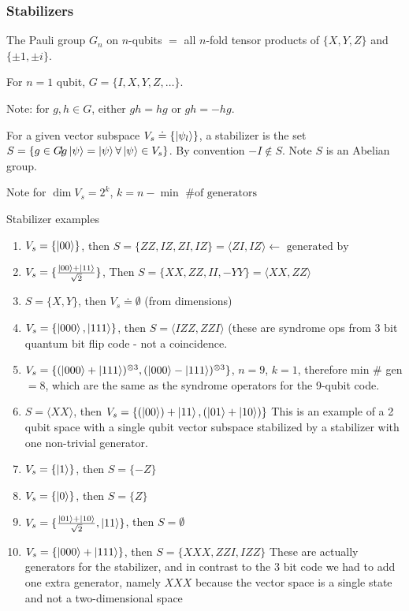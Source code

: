 \subsubsection{Stabilizers}
\begin{definition}
    The Pauli group $G_n$ on $n$-qubits $=$ all $n$-fold tensor products of $\{X,Y,Z\}$ and $\{\pm 1, \pm i\}$. 
\end{definition}
\begin{example}
    For $n=1$ qubit, $G = \{I, X,Y, Z, \ldots \}$. 
\end{example}
Note: for $g,h \in G$, either $gh=hg$ or $gh=-hg$. 
\begin{definition}
    For a given vector subspace $V_s \doteq \{\ket{\psi_l}\}$, a stabilizer is the set $S = \{g \in G \! | \! g \ket{\psi} = \ket{\psi} \forall \ket{\psi} \in V_s\}$. By convention $-I \notin S$. Note $S$ is an Abelian group. 
\end{definition}
Note for $\dim V_s = 2^k$, $k = n - \min \text{ \# of generators}$
\begin{example} Stabilizer examples 
    \begin{enumerate}
        \item $V_s = \{\ket{00}\}$, then $S = \{ZZ,IZ, ZI,IZ\} = \langle ZI, IZ \rangle \leftarrow \text{ generated by}$ 
        \item $V_s = \{\frac{\ket{00} + \ket{11}}{\sqrt{2}}\}$, Then $S = \{XX,ZZ,II,-YY\} = \langle XX,ZZ\rangle$
        \item $S = \{X,Y\}$, then $V_s \doteq \emptyset$ (from dimensions)
        \item $V_s = \{\ket{000}, \ket{111}\}$, then $S = \langle IZZ,ZZI \rangle$ (these are syndrome ops from 3 bit quantum bit flip code - not a coincidence. 
        \item $V_s = \{(\ket{000} + \ket{111})^{\otimes 3}, (\ket{000} - \ket{111})^{\otimes 3}\}$, $n=9$, $k=1$, therefore min \# gen $= 8$, which are the same as the syndrome operators for the 9-qubit code. 
        \item $S= \langle XX \rangle$, then $V_s = \{(\ket{00}) + \ket{11}, (\ket{01} + \ket{10})\}$ This is an example of a 2 qubit space with a single qubit vector subspace stabilized by a stabilizer with one non-trivial generator. 
        \item $V_s = \{\ket{1}\}$, then $S = \{-Z\}$
        \item $V_s = \{\ket{0}\}$, then $S = \{Z\}$
        \item $V_s = \{\frac{\ket{01} + \ket{10}}{\sqrt{2}}, \ket{11}\}$, then $S = \emptyset$
        \item $V_s = \{\ket{000} + \ket{111}\}$, then $S = \{XXX,ZZI,IZZ\}$ These are actually generators for the stabilizer, and in contrast to the 3 bit code we had to add one extra generator, namely $XXX$ because the vector space is a single state and not a two-dimensional space
    \end{enumerate}
\end{example}



